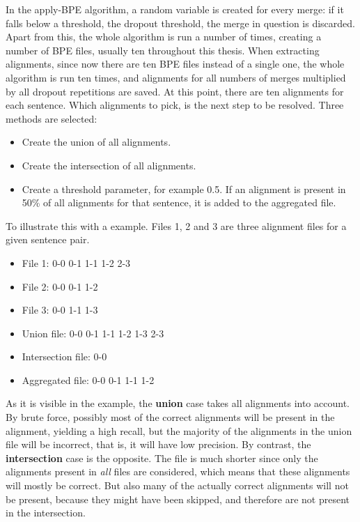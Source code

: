 In the apply-BPE algorithm, a random variable is created for every merge: if it falls below a threshold, the dropout threshold, the merge in question is discarded. Apart from this, the whole algorithm is run a number of times, creating a number of BPE files, usually ten throughout this thesis. When extracting alignments, since now there are ten BPE files instead of a single one, the whole algorithm is run ten times, and alignments for all numbers of merges multiplied by all dropout repetitions are saved. At this point, there are ten alignments for each sentence. Which alignments to pick, is the next step to be resolved. Three methods are selected:

\begin{itemize}
	\item Create the union of all alignments.
	\item Create the intersection of all alignments.
	\item Create a threshold parameter, for example 0.5. If an alignment is present in 50\% of all alignments for that sentence, it is added to the aggregated file.
\end{itemize}

To illustrate this with a example. Files 1, 2 and 3 are three alignment files for a given sentence pair.

\begin{itemize}
	\item File 1: 0-0 0-1 1-1 1-2 2-3
	\item File 2: 0-0 0-1 1-2
	\item File 3: 0-0 1-1 1-3
	\item Union file: 0-0 0-1 1-1 1-2 1-3 2-3
	\item Intersection file: 0-0
	\item Aggregated file: 0-0 0-1 1-1 1-2
\end{itemize}

As it is visible in the example, the \textbf{union} case takes all alignments into account. By brute force, possibly most of the correct alignments will be present in the alignment, yielding a high recall, but the majority of the alignments in the union file will be incorrect, that is, it will have low precision. By contrast, the \textbf{intersection} case is the opposite. The file is much shorter since only the alignments present in \emph{all} files are considered, which means that these alignments will mostly be correct. But also many of the actually correct alignments will not be present, because they might have been skipped, and therefore are not present in the intersection.

